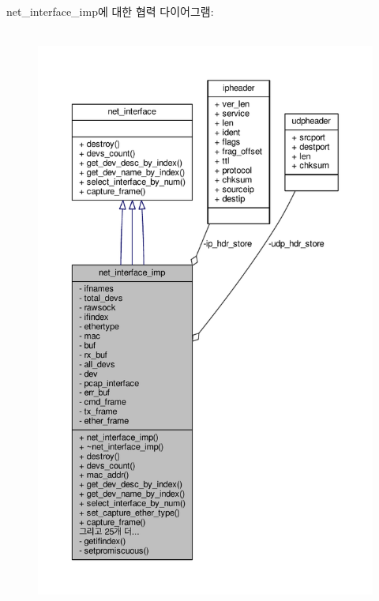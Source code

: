 net\+\_\+interface\+\_\+imp에 대한 협력 다이어그램\+:
\nopagebreak
\begin{figure}[H]
\begin{center}
\leavevmode
\includegraphics[height=550pt]{classavdecc__lib_1_1net__interface__imp__coll__graph}
\end{center}
\end{figure}
